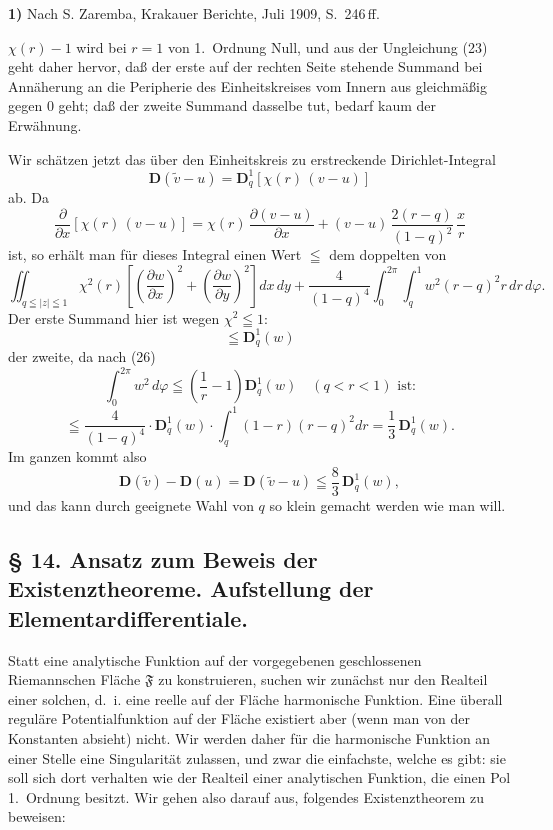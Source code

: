 \documentclass{article}
\begin{document}
\textbf{1)} Nach S. Zaremba, Krakauer Berichte, Juli 1909, S.~246\,ff.

$\chi(r) - 1$ wird bei $r = 1$ von 1.\ Ordnung Null, und aus der Ungleichung (23) geht daher hervor, daß der erste auf der rechten Seite stehende Summand bei Annäherung an die Peripherie des Einheitskreises vom Innern aus gleichmäßig gegen $0$ geht; daß der zweite Summand dasselbe tut, bedarf kaum der Erwähnung.

Wir schätzen jetzt das über den Einheitskreis zu erstreckende Dirichlet-Integral
\[ \mathbf{D}(\tilde{v} - u) = \mathbf{D}_q^1 [\chi(r)\,(v - u)] \]
ab. Da
\[ \frac{\partial}{\partial x}[\chi(r)\,(v - u)] = \chi(r)\,\frac{\partial(v - u)}{\partial x} + (v - u)\,\frac{2(r - q)}{(1 - q)^2}\,\frac{x}{r} \]
ist, so erhält man für dieses Integral einen Wert $\leqq$ dem doppelten von
\[ \iint_{q \leqq |z| \leqq 1} \chi^2(r) \left[ \left(\frac{\partial w}{\partial x}\right)^2 + \left(\frac{\partial w}{\partial y}\right)^2 \right] dx\,dy + \frac{4}{(1 - q)^4} \int_0^{2\pi} \int_q^1 w^2(r - q)^2 r\,dr\,d\varphi. \]
Der erste Summand hier ist wegen $\chi^2 \leqq 1$:
\[ \leqq \mathbf{D}_q^1(w) \]
der zweite, da nach (26)
\[ \int_0^{2\pi} w^2\,d\varphi \leqq \left(\frac{1}{r} - 1\right) \mathbf{D}_q^1(w) \quad (q < r < 1)\text{ ist:} \]
\[ \leqq \frac{4}{(1 - q)^4} \cdot \mathbf{D}_q^1(w) \cdot \int_q^1 (1 - r)(r - q)^2 dr = \frac{1}{3}\,\mathbf{D}_q^1(w). \]
Im ganzen kommt also
\[ \mathbf{D}(\tilde{v}) - \mathbf{D}(u) = \mathbf{D}(\tilde{v} - u) \leqq \frac{8}{3}\,\mathbf{D}_q^1(w), \]
und das kann durch geeignete Wahl von $q$ so klein gemacht werden wie man will.

\subsection*{§ 14. Ansatz zum Beweis der Existenztheoreme. Aufstellung der Elementardifferentiale.}

Statt eine analytische Funktion auf der vorgegebenen geschlossenen Riemannschen Fläche $\mathfrak{F}$ zu konstruieren, suchen wir zunächst nur den Realteil einer solchen, d.~i. eine reelle auf der Fläche harmonische Funktion. Eine überall reguläre Potentialfunktion auf der Fläche existiert aber (wenn man von der Konstanten absieht) nicht. Wir werden daher für die harmonische Funktion an einer Stelle eine Singularität zulassen, und zwar die einfachste, welche es gibt: sie soll sich dort verhalten wie der Realteil einer analytischen Funktion, die einen Pol 1.\ Ordnung besitzt. Wir gehen also darauf aus, folgendes Existenztheorem zu beweisen:
\end{document}
